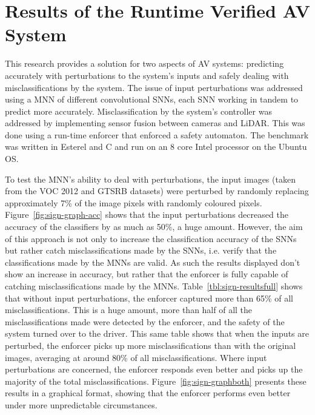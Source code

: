 \section{Results of the Runtime Verified AV System}

This research provides a solution for two aspects of \acf{AV} systems: predicting accurately with perturbations to the system's inputs and safely dealing with misclassifications by the system.
The issue of input perturbations was addressed using a \acf{MNN} of different convolutional \acfp{SNN}, each \ac{SNN} working in tandem to predict more accurately.
Misclassification by the system's controller was addressed by implementing sensor fusion between cameras and \ac{LiDAR}.
This was done using a run-time enforcer that enforced a safety automaton.
The benchmark was written in Esterel and C and run on an 8 core Intel processor on the Ubuntu OS.

To test the \ac{MNN}'s ability to deal with perturbations, the input images (taken from the \ac{VOC} 2012 and \ac{GTSRB} datasets) were perturbed by randomly replacing approximately 7\% of the image pixels with randomly coloured pixels.
Figure~\ref{fig:sign-graph-acc} shows that the input perturbations decreased the accuracy of the classifiers by as much as 50\%, a huge amount.
However, the aim of this approach is not only to increase the classification accuracy of the \acp{SNN} but rather catch misclassifications made by the \acp{SNN}, i.e. verify that the classifications made by the \acp{MNN} are valid.
As such the results displayed don't show an increase in accuracy, but rather that the enforcer is fully capable of catching misclassifications made by the \acp{MNN}.
Table~\ref{tbl:sign-resultsfull} shows that without input perturbations, the enforcer captured more than 65\% of all misclassifications. 
This is a huge amount, more than half of all the misclassifications made were detected by the enforcer, and the safety of the system turned over to the driver.
This same table shows that when the inputs are perturbed, the enforcer picks up more misclassifications than with the original images, averaging at around 80\% of all misclassifications.
Where input perturbations are concerned, the enforcer responds even better and picks up the majority of the total misclassifications.
Figure~\ref{fig:sign-graphboth} presents these results in a graphical format, showing that the enforcer performs even better under more unpredictable circumstances.

